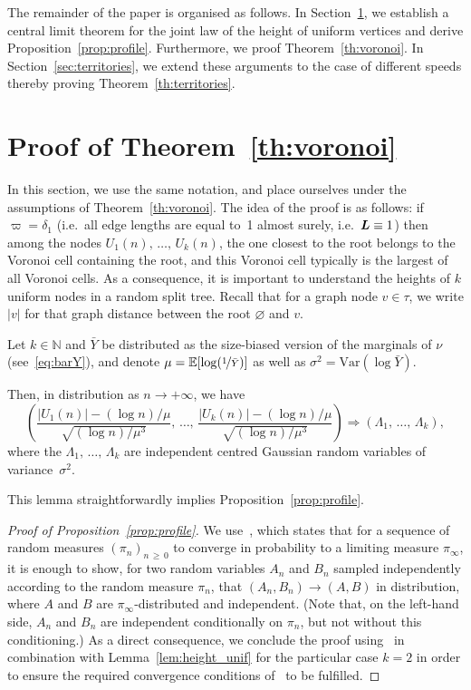 \documentclass[AHL,Unicode,longabstracts,published]{cedram}
\newcommand{\bs}{\ensuremath{\boldsymbol}}
\newcommand{\bbE}{\mathbb{E}}
\newcommand{\bbN}{\mathbb{N}}
\newcommand{\Var}{\mathrm{Var}}
\begin{document}
The remainder of the paper is organised as follows. In Section~\ref{sec:voronoi}, we establish a central limit theorem for the joint law of the height of uniform vertices and derive Proposition~\ref{prop:profile}. Furthermore, we proof Theorem~\ref{th:voronoi}. In Section~\ref{sec:territories}, we extend these arguments to the case of different speeds thereby proving Theorem~\ref{th:territories}.



\section{Proof of Theorem~\ref{th:voronoi}}\label{sec:voronoi}
In this section, we use the same notation, and place ourselves under the assumptions of Theorem~\ref{th:voronoi}. The idea of the proof is as follows: if $\varpi = \delta_1$ (i.e.\ all edge lengths are equal to~1 almost surely, i.e.\ $\bs L \equiv 1$) then among the nodes $U_1(n), \,\ldots,\, U_k(n)$, the one closest to the root belongs to the Voronoi cell containing the root, and this Voronoi cell typically is the largest of all Voronoi cells. As a consequence, it is important to understand the heights of $k$ uniform nodes in a random split tree. Recall that for a graph node $v\in\tau$, we write $|v|$ for that graph distance between the root $\varnothing$ and $v$.

\begin{lemm}\label{lem:height_unif}
Let $k\in\bbN$ and $\bar Y$ be distributed as the size-biased version of the marginals of $\nu$ (see~\eqref{eq:barY}), and denote $\mu = \bbE[\log (\nicefrac1{\bar Y})]$ as well as $\sigma^2 = \Var(\log \bar Y).$

Then, in distribution as $n\to+\infty$, we have
\[
\left(\frac{|U_1(n)| - (\log n)/\mu}{\sqrt{(\log n)/\mu^3}},\,\ldots,\,
\frac{|U_k(n)| - (\log n)/\mu}{\sqrt{(\log n)/\mu^3}}
\right)\Rightarrow (\Lambda_1,\,\ldots,\,\Lambda_k),
\]
where the $\Lambda_1, \,\ldots,\,\Lambda_k$ are independent centred Gaussian random variables of variance~$\sigma^2.$
\end{lemm}

This lemma straightforwardly implies Proposition~\ref{prop:profile}.

\begin{proof}[{Proof of Proposition~\ref{prop:profile}}] We use~\cite[Lemma~3.1]{MM17}, which states that for a sequence of random measures $(\pi_n)_{n\,\geq\,0}$ to converge in probability to a limiting measure $\pi_{\infty}$, it is enough to show,
for two random variables $A_n$ and $B_n$ sampled independently according to the random measure $\pi_n$, that $(A_n, B_n) \to (A, B)$ in distribution, where $A$ and $B$ are $\pi_\infty$-distributed and independent. (Note that, on the left-hand side, $A_n$ and $B_n$ are independent conditionally on $\pi_n$, but not without this conditioning.) As a direct consequence, we conclude the proof using~\cite[Lemma~3.1]{MM17} in combination with Lemma~\ref{lem:height_unif} for the particular case $k=2$ in order to ensure the required convergence conditions of~\cite[Lemma~3.1]{MM17} to be fulfilled.
\end{proof}
\end{document}
